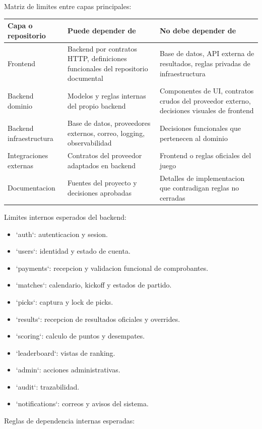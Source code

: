 Matriz de limites entre capas principales:

\begin{longtable}{p{}p{}p{}}
\toprule
\textbf{Capa o repositorio} & \textbf{Puede depender de} & \textbf{No debe depender de} \\
\midrule
Frontend & Backend por contratos HTTP, definiciones funcionales del repositorio documental & Base de datos, API externa de resultados, reglas privadas de infraestructura \\
Backend dominio & Modelos y reglas internas del propio backend & Componentes de UI, contratos crudos del proveedor externo, decisiones visuales de frontend \\
Backend infraestructura & Base de datos, proveedores externos, correo, logging, observabilidad & Decisiones funcionales que pertenecen al dominio \\
Integraciones externas & Contratos del proveedor adaptados en backend & Frontend o reglas oficiales del juego \\
Documentacion & Fuentes del proyecto y decisiones aprobadas & Detalles de implementacion que contradigan reglas no cerradas \\
\bottomrule
\end{longtable}

Limites internos esperados del backend:

\begin{itemize}
  \item `auth`: autenticacion y sesion.
  \item `users`: identidad y estado de cuenta.
  \item `payments`: recepcion y validacion funcional de comprobantes.
  \item `matches`: calendario, kickoff y estados de partido.
  \item `picks`: captura y lock de picks.
  \item `results`: recepcion de resultados oficiales y overrides.
  \item `scoring`: calculo de puntos y desempates.
  \item `leaderboard`: vistas de ranking.
  \item `admin`: acciones administrativas.
  \item `audit`: trazabilidad.
  \item `notifications`: correos y avisos del sistema.
\end{itemize}

Reglas de dependencia internas esperadas:

